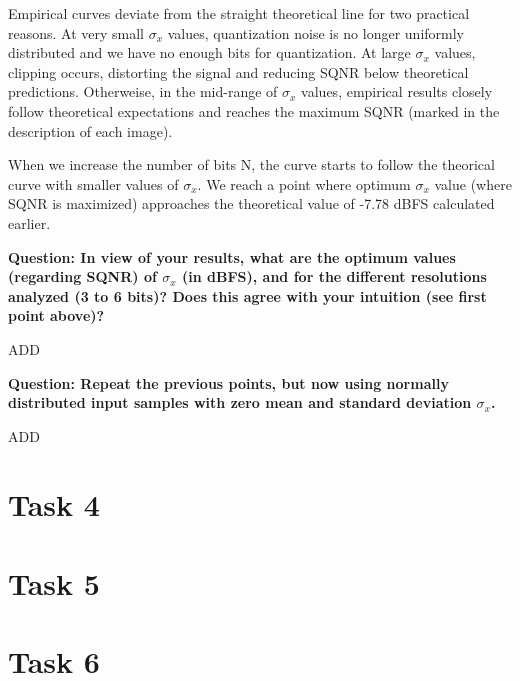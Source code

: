 \documentclass[11pt,a4paper]{article}
\begin{document}
Empirical curves deviate from the straight theoretical line for two practical reasons. At very small $\sigma_x$ values, quantization noise is no longer uniformly distributed and we have no enough bits for quantization.
At large $\sigma_x$ values, clipping occurs, distorting the signal and reducing SQNR below theoretical predictions.
Otherweise, in the mid-range of $\sigma_x$ values, empirical results closely follow theoretical expectations and reaches the maximum SQNR (marked in the description of each image).

When we increase the number of bits N, the curve starts to follow the theorical curve with smaller values of $\sigma_x$.
We reach a point where optimum $\sigma_x$ value (where SQNR is maximized) approaches the theoretical value of -7.78 dBFS calculated earlier.

\vspace{1cm}
\textbf{Question: In view of your results, what are the optimum values (regarding SQNR) of $\sigma_x$ (in dBFS), and for the different resolutions analyzed (3 to 6 bits)?
    Does this agree with your intuition (see first point above)?
}
\vspace{0.5cm}

ADD

\vspace{1cm}
\textbf{Question: Repeat the previous points, but now using normally distributed input samples with zero mean and standard deviation $\sigma_x$.
}
\vspace{0.5cm}

ADD

\vspace{0.5cm}
\section{Task 4}


\vspace{0.5cm}
\section{Task 5}


\vspace{0.5cm}
\section{Task 6}

\end{document}

